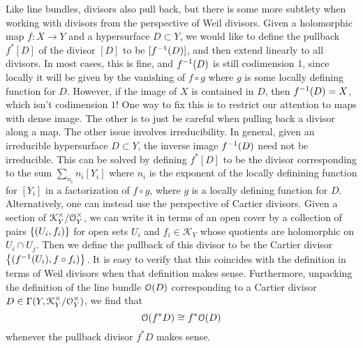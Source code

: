 Like line bundles, divisors also pull back, but there is some more subtlety
when working with divisors from the perspective of Weil divisors.
Given a holomorphic map $f : X \to Y$ and a hypersurface $D \subset Y$,
we would like to define the pullback $f^*[D]$ of the divisor $[D]$ to be
$[f^{-1}(D)]$, and then extend linearly to all divisors. In most cases, this is fine,
and $f^{-1}(D)$ is still codimension $1$, since locally it will be given by
the vanishing of $f \circ g$ where $g$ is some locally defining function for
$D$. However, if the image of $X$ is contained in $D$, then $f^{-1}(D) = X$, which
isn't codimension $1$! One way to fix this is to restrict our attention to maps
with dense image. The other is to just be careful when pulling back a divisor
along a map. The other issue involves irreducibility. In general,
given an irreducible hypersurface $D \subset Y$, the inverse image $f^{-1}(D)$
need not be irreducible. This can be solved by defining $f^*[D]$ to be
the divisor corresponding to the sum $\sum_{n_i}n_i[Y_i]$ where $n_i$ is the
exponent of the locally definining function for $[Y_i]$ in a factorization
of $f \circ g$, where $g$ is a locally defining function for $D$. Alternatively,
one can instead use the perspective of Cartier divisors.
Given a section of $\mathcal{K}_Y^\times/\mathcal{O}_Y^\times$, we can write it
in terms of an open cover by a collection of pairs $\left\lbrace (U_i, f_i) \right\rbrace$ for
open sets $U_i$ and $f_i \in \mathcal{K}_Y$ whose quotients are holomorphic
on $U_i \cap U_j$. Then we define the pullback of this divisor to be
the Cartier divisor $\left\lbrace (f^{-1}(U_i), f \circ f_i) \right\rbrace$. It is easy to verify
that this coincides with the definition in terms of Weil divisors when that
definition makes sense. Furthermore, unpacking the definition of the line
bundle $\mathcal{O}(D)$ corresponding to a Cartier divisor
$D \in \Gamma(Y,\mathcal{K}_Y^\times/\mathcal{O}_Y^\times)$, we find that
\[
\mathcal{O}(f^*D) \cong f^*\mathcal{O}(D)
\]
whenever the pullback divisor $f^*D$ makes sense. \\

